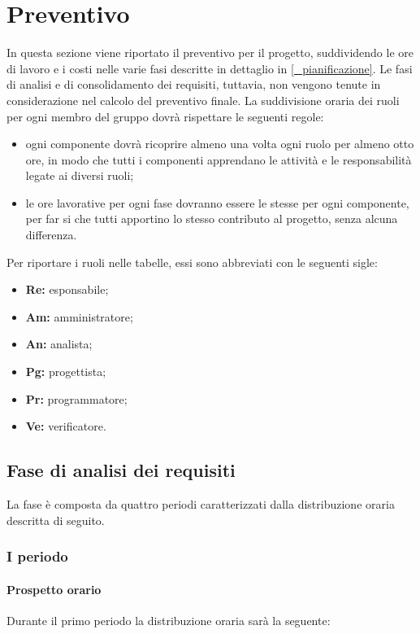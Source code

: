 \section{Preventivo} \label{_preventivo}
In questa sezione viene riportato il preventivo per il progetto, suddividendo le ore di lavoro e i costi nelle varie fasi descritte in dettaglio in \ref{_pianificazione}.
Le fasi di analisi e di consolidamento dei requisiti, tuttavia, non vengono tenute in considerazione nel calcolo del preventivo finale.
La suddivisione oraria dei ruoli per ogni membro del gruppo dovrà rispettare le seguenti regole:
		\begin{itemize}
		\item ogni componente dovrà ricoprire almeno una volta ogni ruolo per almeno otto ore, in modo che tutti i componenti apprendano le attività e le responsabilità legate ai diversi ruoli;
		\item le ore lavorative per ogni fase dovranno essere le stesse per ogni componente, per far si che tutti apportino lo stesso contributo al progetto, senza alcuna differenza.
	\end{itemize}
	 Per riportare i ruoli nelle tabelle, essi sono abbreviati con le seguenti sigle:
			\begin{itemize}
			\item\textbf{Re:} esponsabile;
			\item\textbf{Am:} amministratore;
			\item\textbf{An:} analista;
			\item\textbf{Pg:} progettista;
			\item\textbf{Pr:} programmatore;
			\item\textbf{Ve:} verificatore.
		\end{itemize}
	
	\subsection{Fase di analisi dei requisiti}
	La fase è composta da quattro periodi caratterizzati dalla distribuzione oraria descritta di seguito.

	\subsubsection{I periodo}
	\paragraph{Prospetto orario}
			Durante il primo periodo la distribuzione oraria sarà la seguente:
			
